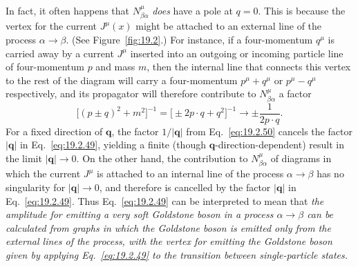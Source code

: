In fact, it often happens that $N^\mu_{\beta\alpha}$ \emph{does} have a pole
at $q=0$. This is because the vertex for the current $J^\mu(x)$ might be
attached to an external line of the process $\alpha\to\beta$. (See
Figure~\ref{fig:19.2}.) For instance, if a four-momentum $q^\mu$ is carried
away by a current $J^\mu$ inserted into an outgoing or incoming particle
line of four-momentum $p$ and mass $m$, then the internal line that connects
this vertex to the rest of the diagram will carry a four-momentum $p^\mu
+q^\mu$ or $p^\mu-q^\mu$ respectively, and its propagator will therefore
contribute to $N^\mu_{\beta\alpha}$ a factor
\begin{equation}
 \big[(p\pm q)^2+m^2\big]^{-1}
 =\big[\pm2p\cdot q+q^2\big]^{-1}
 \longrightarrow \pm\frac{1}{2p\cdot q}.
 \tag{19.2.50}\label{eq:19.2.50}
\end{equation}
For a fixed direction of $\mathbf q$, the factor $1/\lvert\mathbf q\rvert$
from Eq.~\eqref{eq:19.2.50} cancels the factor $\lvert\mathbf q\rvert$ in
Eq.~\eqref{eq:19.2.49}, yielding a finite (though
$\mathbf q$-direction-dependent) result in the limit
$\lvert\mathbf q\rvert\to0$. On the other hand, the contribution to
$N^\mu_{\beta\alpha}$ of diagrams in which the current $J^\mu$ is attached
to an internal line of the process $\alpha\to\beta$ has no singularity for
$\lvert\mathbf q\rvert\to0$, and therefore is cancelled by the factor
$\lvert\mathbf q\rvert$ in Eq.~\eqref{eq:19.2.49}. Thus
Eq.~\eqref{eq:19.2.49} can be interpreted to mean that \emph{the amplitude
for emitting a very soft Goldstone boson in a process $\alpha\to\beta$ can
be calculated from graphs in which the Goldstone boson is emitted only from
the external lines of the process, with the vertex for emitting the
Goldstone boson given by applying Eq.~\eqref{eq:19.2.49} to the transition
between single-particle states.}

